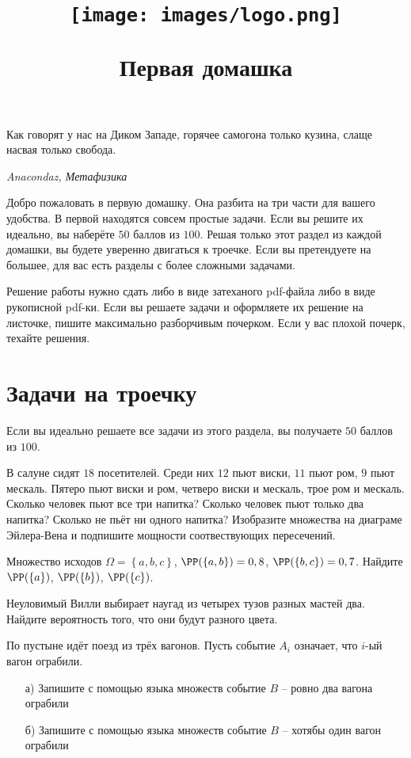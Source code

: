 \documentclass[12pt, a4paper, oneside]{article}
\title{
\begin{center} 
\texttt{[image: images/logo.png]}
\end{center}

Первая домашка}
\begin{document}
\maketitle

\epigraph{Как говорят у нас на Диком Западе, горячее самогона только кузина, слаще насвая только свобода.}{\textit{Anacondaz, Метафизика}}

Добро пожаловать в первую домашку. Она разбита на три части для вашего удобства. В первой находятся совсем простые задачи. Если вы решите их идеально, вы наберёте $50$ баллов из $100.$ Решая только этот раздел из каждой домашки, вы будете уверенно двигаться к троечке. Если вы претендуете на большее, для вас есть разделы с более сложными задачами. 

Решение работы нужно сдать либо в виде затеханого pdf-файла либо в виде рукописной pdf-ки. Если вы решаете задачи и оформляете их решение на листочке, пишите максимально разборчивым почерком. Если у вас плохой почерк, техайте решения. 

\section*{Задачи на троечку}

Если вы идеально решаете все задачи из этого раздела, вы получаете $50$ баллов из $100$.

\begin{problem}{5}
    В салуне сидят $18$ посетителей. Среди них $12$ пьют виски, $11$ пьют ром, $9$ пьют мескаль. Пятеро пьют виски и ром, четверо виски и мескаль, трое ром и мескаль. Сколько человек пьют все три напитка? Сколько человек пьют только два напитка? Сколько не пьёт ни одного напитка? Изобразите множества на диаграме Эйлера-Вена и подпишите мощности соотвествующих пересечений. 
\end{problem}


\begin{problem}{5}
    Множество исходов $\Omega =\left\{a,b,c\right\}$, $\PP(\left\{a,b\right\})=0,8$,
    $\PP(\{b,c\})=0,7$. Найдите $\PP(\{a\})$, $\PP(\{b\})$, $\PP(\{c\})$.
\end{problem}

\begin{problem}{5}
    Неуловимый Вилли выбирает наугад из четырех тузов разных мастей два. Найдите вероятность того, что они будут разного цвета.
\end{problem}

\begin{problem}{5}
    По пустыне идёт поезд из трёх вагонов. Пусть событие $A_i$ означает, что $i$-ый вагон ограбили. 
    
    \begin{enumerate}
    	\item[а)] Запишите с помощью языка множеств событие $B$ -- ровно два вагона ограбили
    	\item[б)] Запишите с помощью языка множеств событие $B$ -- хотябы один вагон ограбили
    \end{enumerate}
\end{problem}
\end{document}
